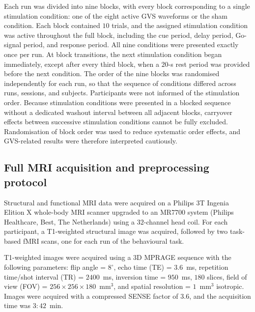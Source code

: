 \documentclass[utf8]{frontiers_suppmat}
\begin{document}
Each run was divided into nine blocks, with every block corresponding to a single stimulation condition: one of the eight active GVS waveforms or the sham condition. Each block contained $10$ trials, and the assigned stimulation condition was active throughout the full block, including the cue period, delay period, Go-signal period, and response period. All nine conditions were presented exactly once per run. At block transitions, the next stimulation condition began immediately, except after every third block, when a $20$-s rest period was provided before the next condition. The order of the nine blocks was randomised independently for each run, so that the sequence of conditions differed across runs, sessions, and subjects. Participants were not informed of the stimulation order. Because stimulation conditions were presented in a blocked sequence without a dedicated washout interval between all adjacent blocks, carryover effects between successive stimulation conditions cannot be fully excluded. Randomisation of block order was used to reduce systematic order effects, and GVS-related results were therefore interpreted cautiously.

\subsection{Full MRI acquisition and preprocessing protocol}
Structural and functional MRI data were acquired on a Philips $3$T Ingenia Elition X whole-body MRI scanner upgraded to an MR7700 system (Philips Healthcare, Best, The Netherlands) using a $32$-channel head coil. For each participant, a T1-weighted structural image was acquired, followed by two task-based fMRI scans, one for each run of the behavioural task.

T1-weighted images were acquired using a 3D MPRAGE sequence with the following parameters: flip angle = $8^\circ$, echo time (TE) = $3.6$~ms, repetition time/shot interval (TR) = $2400$~ms, inversion time = $950$~ms, $180$ slices, field of view (FOV) = $256 \times 256 \times 180$~mm$^3$, and spatial resolution = $1$~mm$^3$ isotropic. Images were acquired with a compressed SENSE factor of $3.6$, and the acquisition time was $3{:}42$~min.
\end{document}
